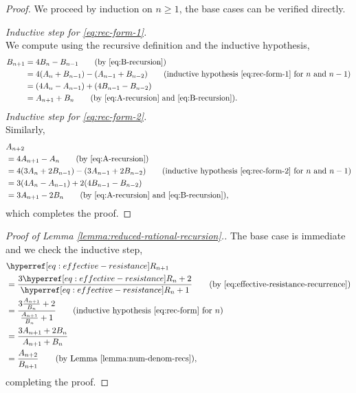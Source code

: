 \documentclass[12pt]{amsart}
\numberwithin{equation}{section}
\begin{document}
	\begin{proof}
		We proceed by induction on $n \geq 1$, the base cases can be verified directly. 
		
		\medskip
		{\it Inductive step for \eqref{eq:rec-form-1}.} \\
		We compute using the recursive definition and the inductive hypothesis, 
		\begin{align*}
			B_{n+1} &= 4 B_{n} - B_{n-1}  \qquad \mbox{(by \eqref{eq:B-recursion})} \\
			&=   4 ( A_{n} + B_{n-1}) - ( A_{n-1} + B_{n-2}) \qquad \mbox{(inductive hypothesis \eqref{eq:rec-form-1} for $n$ and $n-1$)} \\
			&=  (4 A_{n} - A_{n-1} ) + (4 B_{n-1} - B_{n-2})  \\ 
			&= A_{n+1} + B_{n} \qquad \mbox{(by \eqref{eq:A-recursion} and \eqref{eq:B-recursion})}.
		\end{align*}
		\medskip
		{\it Inductive step for \eqref{eq:rec-form-2}.} \\
		Similarly, 
		\begin{align*}
			&A_{n+2} \\
			&= 4 A_{n+1} - A_{n} \qquad \mbox{(by \eqref{eq:A-recursion})} \\
			&= 4 ( 3 A_n +2  B_{n-1} ) - (3 A_{n-1} +2  B_{n-2} ) \qquad \mbox{(inductive hypothesis \eqref{eq:rec-form-2} for $n$ and $n-1$)} \\
			&= 3 ( 4 A_n - A_{n-1}) + 2 ( 4 B_{n-1} - B_{n-2}) \\
			&= 3 A_{n+1} - 2 B_{n} \qquad \mbox{(by \eqref{eq:A-recursion} and \eqref{eq:B-recursion})}, 
		\end{align*}
		which completes the proof.
	\end{proof}
	\begin{proof}[Proof of Lemma \ref{lemma:reduced-rational-recursion}.]
		The base case is immediate and we check the inductive step,
		\begin{align*}
			&\Rn{n+1} \\
			&= \frac{3 \Rn{n} + 2}{\Rn{n} + 1}  \qquad \mbox{(by \eqref{eq:effective-resistance-recurrence})} \\
			&= \frac{ 3 \frac{A_{n+1}}{B_n} + 2}{ \frac{A_{n+1}}{B_n} + 1} \qquad \mbox{(inductive hypothesis \eqref{eq:rec-form} for $n$)} \\
			&= \frac{ 3 A_{n+1} + 2 B_n}{A_{n+1} + B_n} \\
			&= \frac{ A_{n+2}}{B_{n+1}} \qquad \mbox{(by Lemma \ref{lemma:num-denom-recs})}, 
		\end{align*}
		completing the proof.
	\end{proof}
	
\end{document}
